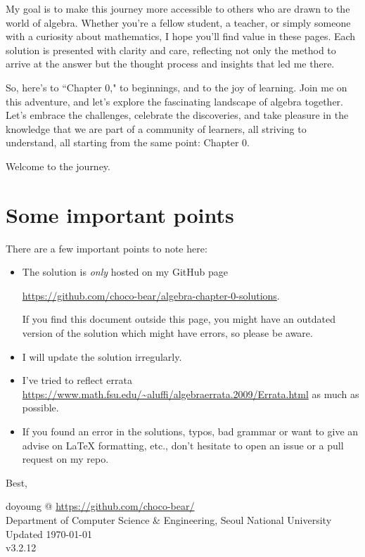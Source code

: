 My goal is to make this journey more accessible to others who are drawn to the world of algebra. Whether you're a fellow student, a teacher, or simply someone with a curiosity about mathematics, I hope you'll find value in these pages. Each solution is presented with clarity and care, reflecting not only the method to arrive at the answer but the thought process and insights that led me there.

So, here's to ``Chapter 0," to beginnings, and to the joy of learning. Join me on this adventure, and let's explore the fascinating landscape of algebra together. Let's embrace the challenges, celebrate the discoveries, and take pleasure in the knowledge that we are part of a community of learners, all striving to understand, all starting from the same point: Chapter 0.

Welcome to the journey.

\newpage
\section*{Some important points}
There are a few important points to note here:
\begin{itemize}
    \item The solution is \emph{only} hosted on my GitHub page
        \begin{center}
		  \url{https://github.com/choco-bear/algebra-chapter-0-solutions}.
        \end{center} 
        If you find this document outside this page, you might have an outdated version of the solution which might have errors, so please be aware.
    \item I will update the solution irregularly.
    \item I've tried to reflect errata \url{https://www.math.fsu.edu/~aluffi/algebraerrata.2009/Errata.html} as much as possible.
    \item If you found an error in the solutions, typos, bad grammar or want to give an advise on LaTeX formatting, etc., don't hesitate to open an issue or a pull request on my repo. 
\end{itemize}

Best,

\begin{flushright}
doyoung @ \url{https://github.com/choco-bear/} \\
Department of Computer Science \& Engineering, Seoul National University \\
Updated \specialdate\today \\
v3.2.12
\end{flushright}